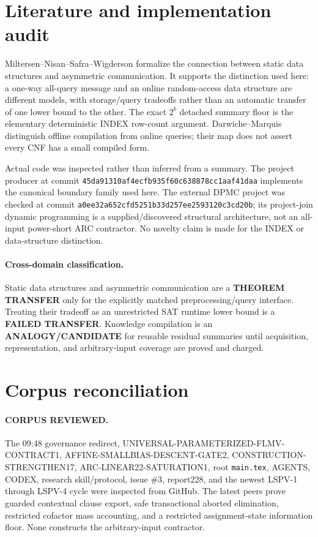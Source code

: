 \documentclass[11pt]{article}
\begin{document}
\section{Literature and implementation audit}
Miltersen--Nisan--Safra--Wigderson formalize the connection between static
data structures and asymmetric communication.  It supports the distinction
used here: a one-way all-query message and an online random-access data
structure are different models, with storage/query tradeoffs rather than an
automatic transfer of one lower bound to the other.  The exact $2^b$ detached
summary floor is the elementary deterministic INDEX row-count argument.
Darwiche--Marquis distinguish offline compilation from online queries; their
map does not assert every CNF has a small compiled form.

Actual code was inspected rather than inferred from a summary.  The project
producer at commit \texttt{45da91310af4ecfb935f60c638878cc1aaf41daa}
implements the canonical boundary family used here.  The external DPMC
project was checked at commit
\texttt{a0ee32a652cfd5251b33d257ee2593120c3cd20b}; its project-join dynamic
programming is a supplied/discovered structural architecture, not an
all-input power-short ARC contractor.  No novelty claim is made for the INDEX
or data-structure distinction.

\paragraph{Cross-domain classification.}
Static data structures and asymmetric communication are a
\textbf{THEOREM TRANSFER} only for the explicitly matched preprocessing/query
interface.  Treating their tradeoff as an unrestricted SAT runtime lower bound
is a \textbf{FAILED TRANSFER}.  Knowledge compilation is an
\textbf{ANALOGY/CANDIDATE} for reusable residual summaries until acquisition,
representation, and arbitrary-input coverage are proved and charged.

\section{Corpus reconciliation}
\paragraph{CORPUS REVIEWED.}
The 09:48 governance redirect, UNIVERSAL-PARAMETERIZED-FLMV-CONTRACT1,
AFFINE-SMALLBIAS-DESCENT-GATE2, CONSTRUCTION-STRENGTHEN17,
ARC-LINEAR22-SATURATION1, root \texttt{main.tex}, AGENTS, CODEX, research
skill/protocol, issue \#3, report228, and the newest LSPV-1 through LSPV-4
cycle were inspected from GitHub.  The latest peers prove guarded contextual
clause export, safe transactional aborted elimination, restricted cofactor
mass accounting, and a restricted assignment-state information floor.  None
constructs the arbitrary-input contractor.
\end{document}
